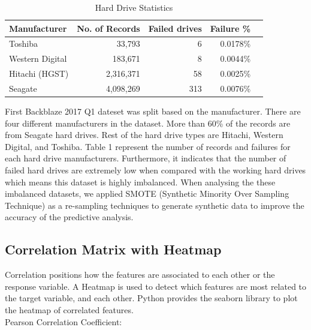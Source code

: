 \documentclass[conference]{IEEEtran}
\begin{document}
  \begin{table}[hbt]
    \begin{center}
    \caption{Hard Drive Statistics}
    \begin{tabular}{||l|r|r|r|r||}
    \hline
    \textbf{Manufacturer} & \textbf{No. of Records} & \textbf{Failed drives} & \textbf{Failure \%} \\ \hline
    Toshiba     & 33,793  & 6   & 0.0178\%    \\ \hline    
    Western Digital     & 183,671  & 8   & 0.0044\%        \\ \hline
    Hitachi (HGST)     & 2,316,371  & 58   & 0.0025\%     \\ \hline
    Seagate     & 4,098,269  & 313   & 0.0076\%        \\ \hline
    
    \end{tabular}
    \end{center}
    \end{table}

First Backblaze 2017 Q1 dateset was split based on the manufacturer. There are four different manufacturers in the dataset. More than 60\% of the records are from Seagate hard drives. Rest of the hard drive types are Hitachi, Western Digital, and Toshiba. Table 1 represent the number of records and failures for each hard drive manufacturers. Furthermore, it indicates that the number of failed hard drives are extremely low when compared with the working hard drives which means this dataset is highly imbalanced. When analysing the these imbalanced datasets, we applied SMOTE (Synthetic Minority Over Sampling Technique) as a re-sampling techniques to generate synthetic data to improve the accuracy of the predictive analysis.



\subsection{Correlation Matrix with Heatmap}

Correlation positions how the features are associated to each other or the response variable. A Heatmap is used to detect which features are most related to the target variable, and each other. Python provides the seaborn library to plot the heatmap of correlated features.\\

{Pearson Correlation Coefficient:}
\\
\end{document}
